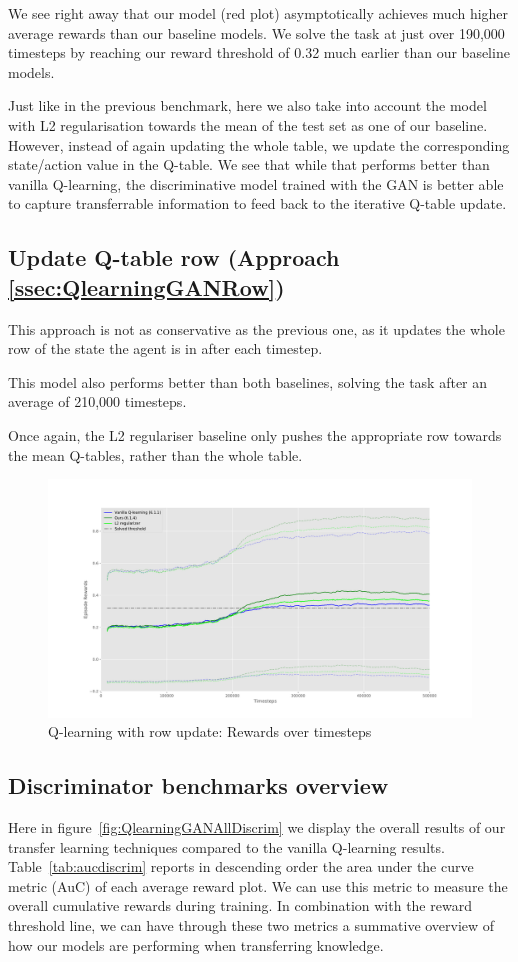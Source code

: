 We see right away that our model (red plot) asymptotically achieves much higher average rewards than our baseline models. We solve the task at just over 190,000 timesteps by reaching our reward threshold  of 0.32 much earlier than our baseline models.

Just like in the previous benchmark, here we also take into account the model with L2 regularisation towards the mean of the test set as one of our baseline. However, instead of again updating the whole table, we update the corresponding state/action value in the Q-table. We see that while that performs better than vanilla Q-learning, the discriminative model trained with the GAN is better able to capture transferrable information to feed back to the iterative Q-table update. 


\subsection{Update Q-table row (Approach \ref{ssec:QlearningGANRow})}
This approach is not as conservative as the previous one, as it updates the whole row of the state the agent is in after each timestep.

This model also performs better than both baselines, solving the task after an average of 210,000 timesteps.

Once again, the L2 regulariser baseline only pushes the appropriate row towards the mean Q-tables, rather than the whole table.

\begin{figure}[H]
\centering
\includegraphics[width=15cm]{Figures/QlearningGANRowBench}
\caption{Q-learning with row update: Rewards over timesteps}
\label{fig:QlearningGANRowBench}
\end{figure}

\subsection{Discriminator benchmarks overview}
Here in figure~\ref{fig:QlearningGANAllDiscrim} we display the overall results of our transfer learning techniques compared to the vanilla Q-learning results. Table~\ref{tab:aucdiscrim} reports in descending order the area under the curve metric (AuC) of each average reward plot. We can use this metric to measure the overall cumulative rewards during training. In combination with the reward threshold line, we can have through these two metrics a summative overview of how our models are performing when transferring knowledge.

